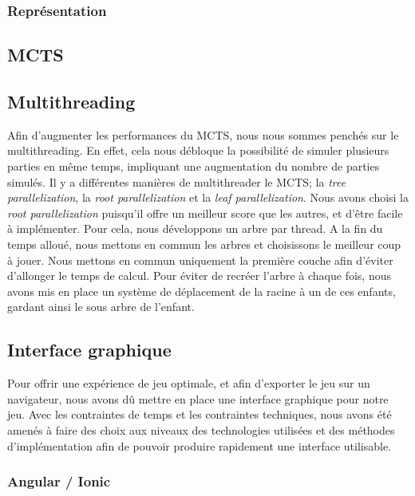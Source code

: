 \documentclass[a4paper,11pt]{article}
\begin{document}
\hypertarget{repruxe9sentation}{%
\subsubsection{Représentation}\label{repruxe9sentation}}

\hypertarget{mcts}{%
\subsection{MCTS}\label{mcts}}

\hypertarget{multithreading}{%
\subsection{Multithreading}\label{multithreading}}

Afin d'augmenter les performances du MCTS, nous nous sommes penchés sur
le multithreading. En effet, cela nous débloque la possibilité de
simuler plusieurs parties en même temps, impliquant une augmentation du
nombre de parties simulés. Il y a différentes manières de multithreader
le MCTS; la \emph{tree parallelization}, la \emph{root parallelization}
et la \emph{leaf parallelization}. Nous avons choisi la \emph{root
parallelization} puisqu'il offre un meilleur score que les autres, et
d'être facile à implémenter. Pour cela, nous développons un arbre par
thread. A la fin du temps alloué, nous mettons en commun les arbres et
choisissons le meilleur coup à jouer. Nous mettons en commun uniquement
la première couche afin d'éviter d'allonger le temps de calcul. Pour
éviter de recréer l'arbre à chaque fois, nous avons mis en place un
système de déplacement de la racine à un de ces enfants, gardant ainsi
le sous arbre de l'enfant.

\hypertarget{interface-graphique}{%
\subsection{Interface graphique}\label{interface-graphique}}

Pour offrir une expérience de jeu optimale, et afin d'exporter le jeu
sur un navigateur, nous avons dû mettre en place une interface graphique
pour notre jeu. Avec les contraintes de temps et les contraintes
techniques, nous avons été amenés à faire des choix aux niveaux des
technologies utilisées et des méthodes d'implémentation afin de pouvoir
produire rapidement une interface utilisable.

\hypertarget{angular-ionic}{%
\subsubsection{Angular / Ionic}\label{angular-ionic}}
\end{document}

